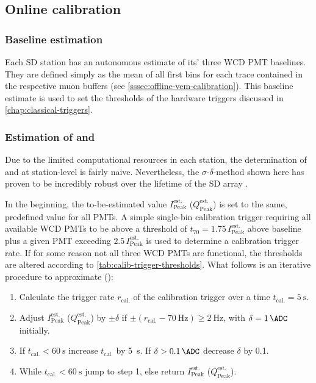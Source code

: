 \subsection{Online calibration}
\label{ssec:online-calibration}

\subsubsection{Baseline estimation}
\label{sssec:online-baseline-estimation}

Each SD station has an autonomous estimate of its' three WCD PMT baselines. They are defined simply as the mean of all first bins for each trace contained in the 
respective muon buffers (see \autoref{sssec:offline-vem-calibration}). This baseline estimate is used to set the thresholds of the hardware triggers discussed in 
\autoref{chap:classical-triggers}.

\subsubsection{Estimation of \Ipeak and \Qpeak}
\label{sssec:offline-vem-calibration}

Due to the limited computational resources in each station, the determination of \Ipeak and \Qpeak at station-level is fairly naive. Nevertheless, the 
$\sigma$-$\delta$-method shown here has proven to be incredibly robust over the lifetime of the SD array \cite{DesignReport}. 

In the beginning, the to-be-estimated value $I_\text{Peak}^\text{est.}$ ($Q_\text{Peak}^\text{est.}$) is set to the same, predefined value for all PMTs. A simple
single-bin calibration trigger requiring all available WCD PMTs to be above a threshold of $t_{70} = 1.75\,I_\text{Peak}^\text{est.}$ above baseline plus a given 
PMT exceeding $2.5\,I_\text{Peak}^\text{est.}$ is used to determine a calibration trigger rate. If for some reason not all three WCD PMTs are functional, the 
thresholds are altered according to \autoref{tab:calib-trigger-thresholds}. What follows is an iterative procedure to approximate \Ipeak (\Qpeak):

\begin{enumerate}
	\item Calculate the trigger rate $r_\text{cal.}$ of the calibration trigger over a time $t_\text{cal.} = \SI{5}{\second}$.
	\item Adjust $I_\text{Peak}^\text{est.}$ ($Q_\text{Peak}^\text{est.}$) by $\pm\delta$ if $\pm(r_\text{cal.}-\SI{70}{\hertz})\geq\SI{2}{\hertz}$, with
	$\delta = \SI{1}{\ADC}$ initially.
	\item If $t_\text{cal.} < \SI{60}{\second}$ increase $t_\text{cal.}$ by \SI{5}{\second}. If $\delta > \SI{0.1}{\ADC}$ decrease $\delta$ by \SI{0.1}{\ADC}.
	\item While $t_\text{cal.} < \SI{60}{\second}$ jump to step 1, else return $I_\text{Peak}^\text{est.}$ ($Q_\text{Peak}^\text{est.}$).  
\end{enumerate}

